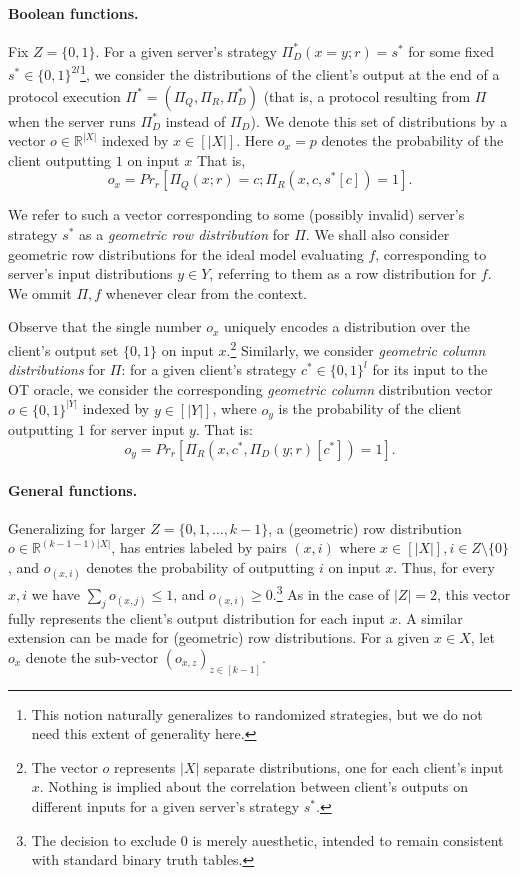 \documentclass[a4paper]{article}
\newcommand{\R}{\mathbb{R}}
\begin{document}
\paragraph{Boolean functions.} Fix $Z=\{0,1\}$. For a given server's strategy $\Pi^*_D(x=y;r)=s^*$ for some fixed $s^*\in\{0,1\}^{2l}$\footnote{This notion naturally generalizes to randomized strategies, but we do not need this extent of generality here.}, we consider the distributions of the client's output at the end of a protocol execution $\Pi^*=(\Pi_Q,\Pi_R,\Pi^*_D)$ (that is, a protocol resulting from $\Pi$ when the server runs $\Pi^*_D$ instead of $\Pi_D$). We denote this set of distributions
by a vector $o\in \R^{|X|}$ indexed by $x\in [|X|]$. Here $o_x=p$ denotes the probability of the client outputting $1$ on input $x$
That is,
\[o_x = Pr_r[\Pi_Q(x;r)=c;\Pi_R(x,c,s^*[c])=1].\]

We refer to such a vector corresponding to some (possibly invalid) server's strategy $s^*$ as a \emph{geometric row distribution} for $\Pi$. 
We shall also consider geometric row distributions for the ideal model evaluating $f$, corresponding to server's input distributions $y\in Y$, referring to them as a row distribution for $f$. We ommit $\Pi,f$ whenever clear from the context.

Observe that the single number $o_x$ uniquely encodes a distribution over the client's output set $\{0,1\}$ on input $x$.\footnote{The vector $o$ represents $|X|$ separate distributions, one for each client's input $x$. Nothing is implied about the correlation between client's outputs on different inputs for a given server's strategy $s^*$.} Similarly, we consider \emph{geometric column distributions} for $\Pi$: for a given client's strategy $c^*\in\{0,1\}^l$ for its input to the OT oracle, we consider the corresponding \emph{geometric column} distribution vector $o\in \{0,1\}^{|Y|}$ indexed by  $y\in [|Y|]$, where $o_y$ is the probability of the client outputting $1$ for server input $y$. That is:
\[o_y = Pr_r[\Pi_R(x,c^*,\Pi_D(y;r)[c^*])=1].\]

\paragraph{General functions.} Generalizing for larger $Z=\{0,1,\ldots,k-1\}$, a (geometric) row distribution $o\in \mathbb{R}^{(k-1-1)|X|}$, has entries labeled by
pairs $(x,i)$ where $x\in [|X|],i\in Z\setminus{\{0\}}$, and $o_{(x,i)}$ denotes the probability of outputting $i$ on input $x$. Thus, for every $x,i$ we have $\sum_j o_{(x,j)}\leq 1$, and $o_{(x,i)}\geq 0$.\footnote{The decision to exclude 0 is merely auesthetic, intended to remain consistent with standard binary truth tables.}
As in the case of $|Z|=2$, this vector fully represents the client's output distribution for each input $x$. A similar extension can be made for (geometric) row distributions. For a given $x\in X$, let $o_x$ denote the sub-vector $(o_{x,z})_{z\in [k-1]}$.
\end{document}
